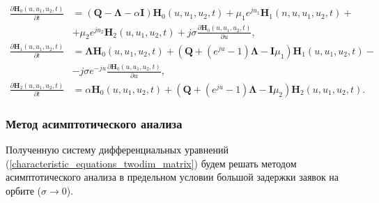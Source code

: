 \begin{equation} \label{characteristic_equations_twodim_map_matrix}
	\begin{split}
		\frac{{\partial \boldsymbol{H}_{0}(u,u_{1},u_{2},t)}}{{\partial t}} &= (\boldsymbol{Q}-\boldsymbol{\Lambda}-\alpha\boldsymbol{I})\boldsymbol{H}_{0}(u,u_{1},u_{2},t) + \mu_{1} e^{ju_{1}}\boldsymbol{H}_{1}(n,u,u_{1},u_{2},t)  + \\  &+ \mu_{2}e^{ju_{2}}\boldsymbol{H}_{2}(u,u_{1},u_{2},t) + j\sigma
		\frac{{\partial \boldsymbol{H}_{0}(u,u_{1},u_{2},t)}}{{\partial u}},
		\\
		\frac{{\partial \boldsymbol{H}_{1}(u,u_{1},u_{2},t)}}{{\partial t}} &= \boldsymbol{\Lambda} \boldsymbol{H}_{0}(u,u_{1},u_{2},t) +  (\boldsymbol{Q}+(e^{ju}-1)\boldsymbol{\Lambda} - \boldsymbol{I}\mu_{1})\boldsymbol{H}_{1}(u,u_{1},u_{2},t) -\\ &- j\sigma e^{-ju}
		\frac{{\partial \boldsymbol{H}_{0}(u,u_{1},u_{2},t)}}{{\partial u}},
		\\
		\frac{{\partial \boldsymbol{H}_{2}(u,u_{1},u_{2},t)}}{{\partial t}} &= \alpha \boldsymbol{H}_{0}(u,u_{1},u_{2},t) + (\boldsymbol{Q}+(e^{ju}-1)\boldsymbol{\Lambda} - \boldsymbol{I}\mu_{2})\boldsymbol{H}_{2}(u,u_{1},u_{2},t).
	\end{split}
\end{equation} 
\subsubsection{Метод асимптотического анализа}
Полученную систему дифференциальных уравнений (\ref{characteristic_equations_twodim_matrix}) будем решать методом асимптотического анализа в предельном условии большой задержки заявок на орбите ($\sigma \xrightarrow{} 0$).

